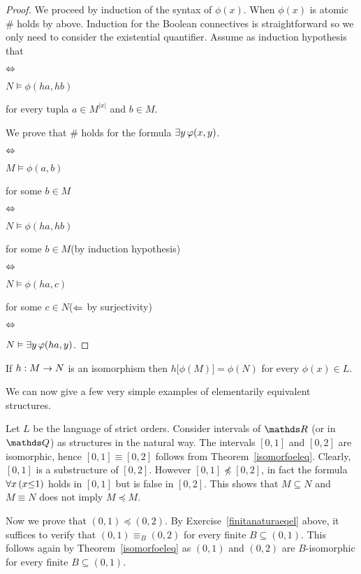 \documentclass[creche.tex]{subfiles}
\begin{document}
\begin{proof}We proceed by induction of the syntax of $\phi(x)$.
When $\phi(x)$ is atomic \# holds by  above.
Induction for the Boolean connectives is straightforward so we only need to consider the existential quantifier.
Assume as induction hypothesis that


\hspace*{18ex}\parbox{7ex}{\hfil$\Leftrightarrow$}\parbox{15ex}{$N\models \phi(ha,hb)$} for every tupla $a\in M^{|x|}$ and $b\in M$.

We prove that \# holds for the formula $\exists y\,\varphi(x,y)$.



\hspace*{18ex}\parbox{7ex}{\hfil$\Leftrightarrow$}\parbox{13ex}{$M\models\phi(a,b)$}for some $b\in M$

\hspace*{18ex}\parbox{7ex}{\hfil$\Leftrightarrow$}\parbox{13ex}{$N\models\phi(ha,hb)$}for some $b\in M$\hfill (by induction hypothesis)

\hspace*{18ex}\parbox{7ex}{\hfil$\Leftrightarrow$}\parbox{13ex}{$N\models\phi(ha,c)$}for some $c\in N$\hfill ($\Leftarrow$ by surjectivity)

\hspace*{18ex}\parbox{7ex}{\hfil$\Leftrightarrow$}$N\vDash\exists y\,\varphi(ha,y)$.
\end{proof}


\begin{corollary}\label{corol_def_set_invariant}
If $h:M\rightarrow N$ is an isomorphism then $h\big[\phi(M)\big]=\phi(N)$ for every $\phi(x)\in L$.\QED
\end{corollary}

We can now give a few very simple examples of elementarily equivalent structures.

\begin{example}\label{expl_ordini_elem}
Let $L$ be the language of strict orders.
Consider intervals of $\RR$ (or in $\QQ$) as structures in the natural way.
The intervals $[0,1]$ and $[0,2]$ are isomorphic, hence $[0,1]\equiv[0,2]$ follows from Theorem~\ref{isomorfoeleq}.
Clearly, $[0,1]$ is a substructure of $[0,2]$.
However $[0,1]\npreceq [0,2]$, in fact the formula $\forall  x\,(x\mathord\le1)$ holds in $[0,1]$ but is false in $[0,2]$. This shows that $M\subseteq N$ and $M\equiv N$ does not imply $M\preceq M$.

Now we prove that $(0,1)\preceq (0,2)$.
By Exercise~\ref{finitanaturaeqel} above, it suffices to verify that $(0,1)\equiv_B  (0,2)$ for every finite $B\subseteq(0,1)$.
This follows again by Theorem~\ref{isomorfoeleq} as $(0,1)$ and $(0,2)$ are $B$-isomorphic for every finite $B\subseteq(0,1)$.\QED
\end{example}
\end{document}
